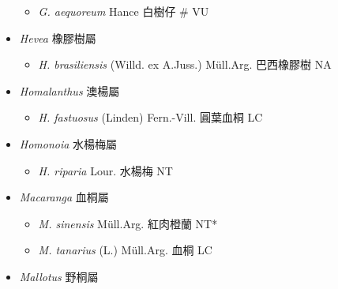 \begin{itemize}
  \begin{itemize}
        \item[] \textit{G. aequoreum} Hance  白樹仔  \# VU
  \end{itemize}
 \item[] \textit{Hevea} 橡膠樹屬
                                
  \begin{itemize}
        \item[] \textit{H. brasiliensis} (Willd. ex A.Juss.) Müll.Arg.  巴西橡膠樹   NA
  \end{itemize}
 \item[] \textit{Homalanthus} 澳楊屬
                                
  \begin{itemize}
        \item[] \textit{H. fastuosus} (Linden) Fern.-Vill.  圓葉血桐   LC
  \end{itemize}
 \item[] \textit{Homonoia} 水楊梅屬
                                
  \begin{itemize}
        \item[] \textit{H. riparia} Lour.  水楊梅   NT
  \end{itemize}
 \item[] \textit{Macaranga} 血桐屬
                                
  \begin{itemize}
        \item[] \textit{M. sinensis} Müll.Arg.  紅肉橙蘭   NT*
        \item[] \textit{M. tanarius} (L.) Müll.Arg.  血桐   LC
  \end{itemize}
 \item[] \textit{Mallotus} 野桐屬
                                

\end{itemize}
